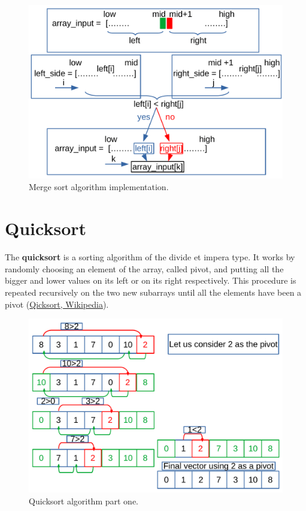 \begin{figure}[H]
	\begin{center}
		\includegraphics[scale=.6]{chapters/searchandsorting/images/sorting_7.pdf}
		\caption[Merge sort algorithm implementation.]{Merge sort algorithm implementation.}
		\label{sorting_7}
	\end{center}
\end{figure}

\section{Quicksort}
The \textbf{quicksort} is a sorting algorithm of the divide et impera type. It works by randomly choosing an element of the array, called pivot, and putting all the bigger and lower values on its left or on its right respectively. This procedure is repeated recursively on the two new subarrays until all the elements have been a pivot \cite{wikiqicksort} (\href{https://en.wikipedia.org/wiki/Quicksort}{Qicksort, Wikipedia}). 
\begin{figure}[H]
	\begin{center}
		\includegraphics[scale=.6]{chapters/searchandsorting/images/sorting_8.pdf}
		\caption[Quicksort algorithm part one.]{Quicksort algorithm part one.}
		\label{sorting_8}
	\end{center}
\end{figure}

